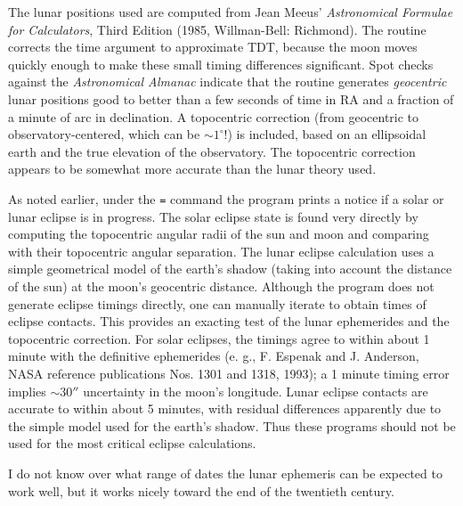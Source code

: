 \par
The lunar positions used are computed from Jean Meeus' {\it Astronomical 
Formulae for Calculators}, Third Edition (1985, Willman-Bell: Richmond).  
The routine corrects the time argument to approximate TDT, because the 
moon moves quickly enough to make these small timing differences significant.
Spot checks against the {\it Astronomical Almanac} indicate that the routine 
generates {\it geocentric} lunar positions good to better than a few 
seconds of time in RA and a fraction of a minute of arc in declination.  
A topocentric correction (from geocentric to observatory-centered, which 
can be $\sim 1^{\circ}$!) is included, based on an ellipsoidal earth and 
the true elevation of the observatory.  The topocentric correction appears 
to be somewhat more accurate than the lunar theory used.  

As noted earlier, under the {\tt =} command the program prints a notice if 
a solar or lunar eclipse is in progress.  The solar eclipse state is found 
very directly by computing the topocentric angular radii of the sun and moon 
and comparing with their topocentric angular separation.  The lunar eclipse 
calculation uses a simple geometrical model of the earth's shadow (taking 
into account the distance of the sun) at the moon's geocentric distance.  
Although the program does not generate eclipse timings directly, one can 
manually iterate to obtain times of eclipse contacts.  This provides an 
exacting test of the lunar ephemerides and the topocentric correction.  
For solar eclipses, the timings agree to within about 1 minute with the 
definitive ephemerides (e. g., F. Espenak and J. Anderson, NASA reference
publications Nos. 1301 and 1318, 1993); a 1 minute timing error implies 
$\sim 30''$ uncertainty in the moon's longitude.  Lunar eclipse contacts are
accurate to within about 5 minutes, with residual differences apparently 
due to the simple model used for the earth's shadow.  Thus these programs 
should not be used for the most critical eclipse calculations.

I do not know over what range of dates the lunar ephemeris can be expected 
to work well, but it works nicely toward the end of the twentieth century.

